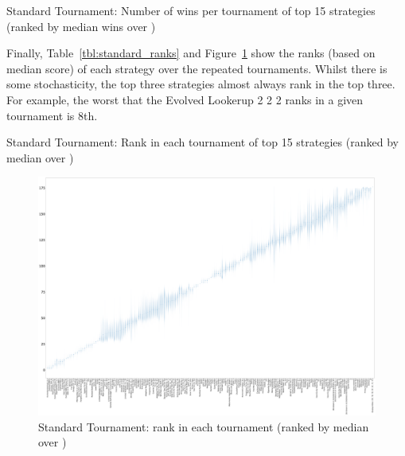 \documentclass{article}
\begin{document}
\begin{table}[!hbtp]
    \centering
        
        \caption{Standard Tournament: Number of wins per tournament
        of top 15 strategies (ranked by median wins over
        \protecttournaments)}
        \label{tbl:standard_wins_top_winners}
\end{table}

Finally, Table~\ref{tbl:standard_ranks} and
Figure~\ref{fig:standard_ranks_boxplot} show the ranks (based on median score)
of each strategy over the repeated tournaments. Whilst there is some
stochasticity, the top three strategies almost always rank in the top three. For
example, the worst that the Evolved Lookerup 2 2 2 ranks in a given tournament
is 8th.


\begin{table}[!hbtp]
    \centering
        
        \caption{Standard Tournament: Rank in each tournament
        of top 15 strategies (ranked by median over
        \protecttournaments)}
        \label{tbl:standard_ranks}
\end{table}

\begin{landscape}
    \begin{figure}[!hbtp]
        \centering
        \includegraphics[width=\paperwidth]{./assets/standard_ranks_boxplots.pdf}
        \caption{Standard Tournament: rank in each tournament (ranked by
        median over
        \protecttournaments)}
        \label{fig:standard_ranks_boxplot}
    \end{figure}
\end{landscape}
\end{document}
